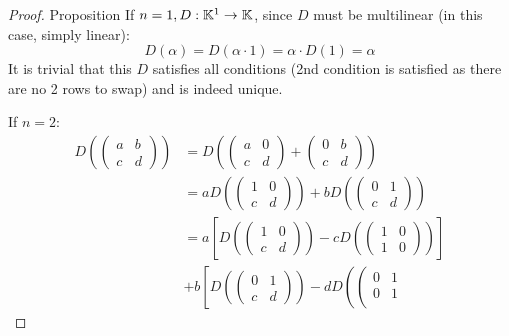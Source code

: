 \begin{proof} {Proposition}
    If \(n=1, D: \mathbb{K}^1 \to \mathbb{K}\), since \(D\) must be multilinear (in this case, simply linear):
    \[
    D (\alpha) = D(\alpha \cdot 1) = \alpha \cdot D(1) = \alpha
    \]
    It is trivial that this \(D\) satisfies all conditions (2nd condition is satisfied as there are no 2 rows to swap) and is indeed unique.

    If \(n=2\):
    \begin{align*}
        D\left(\left(\begin{array}{cc}
        a & b \\
        c & d
        \end{array}\right)\right) &= D\left(\left(\begin{array}{cc}
        a & 0 \\
        c & d
        \end{array}\right) + \left(\begin{array}{cc}
        0 & b \\
        c & d
        \end{array}\right)\right) \\
        &= a D\left(\left(\begin{array}{cc}
        1 & 0 \\
        c & d
        \end{array}\right)\right) + bD\left(\left(\begin{array}{cc}
        0 & 1 \\
        c & d
        \end{array}\right)\right)\\
        &= a\left[D\left(\left(\begin{array}{cc}
        1 & 0 \\
        c & d
        \end{array}\right)\right) - cD\left(\left(\begin{array}{cc}
        1 & 0 \\
        1 & 0
        \end{array}\right)\right)\right]\\
        &+ b\left[D\left(\left(\begin{array}{cc}
            0 & 1 \\
            c & d
            \end{array}\right)\right) - dD\left(\left(\begin{array}{cc}
            0 & 1\\
            0 & 1\\

\end{array}
\end{align*}
\end{proof}
